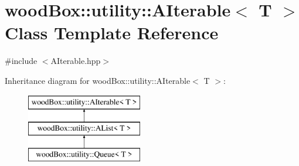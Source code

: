 \hypertarget{classwood_box_1_1utility_1_1_a_iterable}{}\section{wood\+Box\+:\+:utility\+:\+:A\+Iterable$<$ T $>$ Class Template Reference}
\label{classwood_box_1_1utility_1_1_a_iterable}


{\ttfamily \#include $<$A\+Iterable.\+hpp$>$}

Inheritance diagram for wood\+Box\+:\+:utility\+:\+:A\+Iterable$<$ T $>$\+:\begin{figure}[H]
\begin{center}
\leavevmode
\includegraphics[height=3.000000cm]{classwood_box_1_1utility_1_1_a_iterable}
\end{center}
\end{figure}
